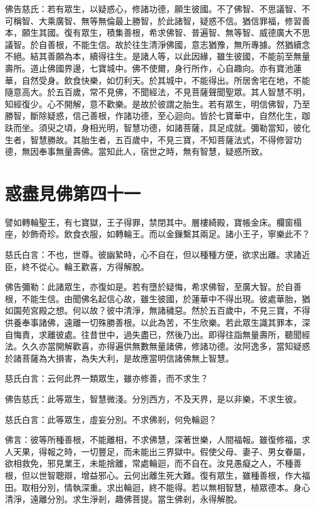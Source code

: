 \documentclass{zhvt-classic}
\begin{document}
佛告慈氏：若有眾生，以疑惑心，修諸功德，願生彼國。不了佛智、不思議智、不可稱智、大乘廣智、無等無倫最上勝智，於此諸智，疑惑不信。猶信罪福，修習善本，願生其國。復有眾生，積集善根，希求佛智、普遍智、無等智、威德廣大不思議智。於自善根，不能生信。故於往生清淨佛國，意志猶豫，無所專據。然猶續念不絕。結其善願為本，續得往生。是諸人等，以此因緣，雖生彼國，不能前至無量壽所。道止佛國界邊，七寶城中。佛不使爾，身行所作，心自趣向。亦有寶池蓮華，自然受身。飲食快樂，如忉利天。於其城中，不能得出。所居舍宅在地，不能隨意高大。於五百歲，常不見佛，不聞經法，不見菩薩聲聞聖眾。其人智慧不明，知經復少。心不開解，意不歡樂。是故於彼謂之胎生。若有眾生，明信佛智，乃至勝智，斷除疑惑，信己善根，作諸功德，至心迴向。皆於七寶華中，自然化生，跏趺而坐。須臾之頃，身相光明，智慧功德，如諸菩薩，具足成就。彌勒當知，彼化生者，智慧勝故。其胎生者，五百歲中，不見三寶，不知菩薩法式，不得修習功德，無因奉事無量壽佛。當知此人，宿世之時，無有智慧，疑惑所致。

\chapter*{惑盡見佛第四十一}

譬如轉輪聖王，有七寶獄，王子得罪，禁閉其中。層樓綺殿，寶帳金床。欄窗榻座，妙飾奇珍。飲食衣服，如轉輪王。而以金鏁繫其兩足。諸小王子，寧樂此不？

慈氏白言：不也，世尊。彼幽縶時，心不自在，但以種種方便，欲求出離。求諸近臣，終不從心。輪王歡喜，方得解脫。

佛告彌勒：此諸眾生，亦復如是。若有墮於疑悔，希求佛智，至廣大智。於自善根，不能生信。由聞佛名起信心故，雖生彼國，於蓮華中不得出現。彼處華胎，猶如園苑宮殿之想。何以故？彼中清淨，無諸穢惡。然於五百歲中，不見三寶，不得供養奉事諸佛，遠離一切殊勝善根。以此為苦，不生欣樂。若此眾生識其罪本，深自悔責，求離彼處。往昔世中，過失盡已，然後乃出。即得往詣無量壽所，聽聞經法。久久亦當開解歡喜，亦得遍供無數無量諸佛，修諸功德。汝阿逸多，當知疑惑於諸菩薩為大損害，為失大利，是故應當明信諸佛無上智慧。

慈氏白言：云何此界一類眾生，雖亦修善，而不求生？

佛告慈氏：此等眾生，智慧微淺。分別西方，不及天界，是以非樂，不求生彼。

慈氏白言：此等眾生，虛妄分別。不求佛剎，何免輪迴？

佛言：彼等所種善根，不能離相，不求佛慧，深著世樂，人間福報。雖復修福，求人天果，得報之時，一切豐足，而未能出三界獄中。假使父母、妻子、男女眷屬，欲相救免，邪見業王，未能捨離，常處輪迴，而不自在。汝見愚癡之人，不種善根，但以世智聰辯，增益邪心。云何出離生死大難。復有眾生，雖種善根，作大福田。取相分別，情執深重。求出輪迴，終不能得。若以無相智慧，植眾德本。身心清淨，遠離分別。求生淨剎，趣佛菩提。當生佛剎，永得解脫。
\end{document}
